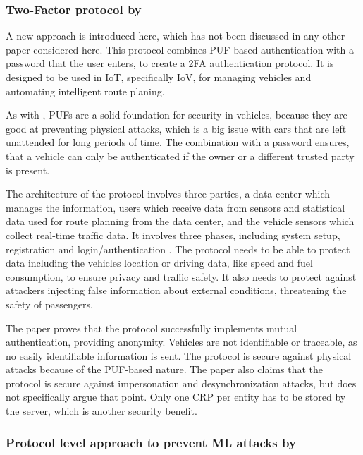 \subsubsection{Two-Factor protocol by \citeauthor*{Jiang2019}}
\label{sec:review_protocol_7}

A new approach is introduced here, which has not been discussed in any other paper considered here.
This protocol combines PUF-based authentication with a password that the user enters,
to create a \ac{2FA} authentication protocol.
It is designed to be used in IoT, specifically \ac{IoV}, for managing vehicles and
automating intelligent route planing. \cite[][p. 195]{Jiang2019}

As with \cite{Bansal2020}, PUFs are a solid foundation for security in vehicles,
because they are good at preventing physical attacks, which is a big issue
with cars that are left unattended for long periods of time.
The combination with a password ensures, that a vehicle can only be authenticated if the owner
or a different trusted party is present. \cite[][p. 195]{Jiang2019}

The architecture of the protocol involves three parties, a data center which manages the information, users which
receive data from sensors and statistical data used for route planning from the data center, and the vehicle
sensors which collect real-time traffic data. It involves three phases, including system
setup, registration and login/authentication \cite[][p. 197]{Jiang2019}.
The protocol needs to be able to protect data including the vehicles
location or driving data, like speed and fuel consumption, to ensure privacy and traffic safety.
It also needs to protect against attackers injecting false information about external conditions,
threatening the safety of passengers. \cite[][p. 195f]{Jiang2019}

The paper proves that the protocol successfully implements mutual authentication, providing anonymity.
Vehicles are not identifiable or traceable, as no easily identifiable information is sent.
The protocol is secure against physical attacks because of the PUF-based nature.
The paper also claims that the protocol is secure against impersonation and desynchronization attacks,
but does not specifically argue that point.
Only one CRP per entity has to be stored by the server, which is another security benefit. \cite[][p. 199f]{Jiang2019}


\subsubsection{Protocol level approach to prevent ML attacks by \citeauthor*{Gope2022}}
\label{sec:review_protocol_8}

